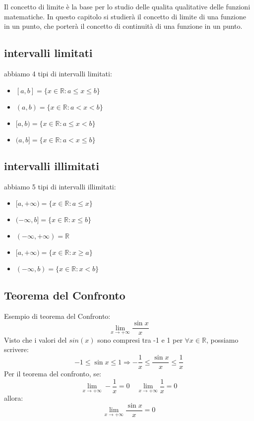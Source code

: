 Il concetto di limite è la base per lo studio delle qualita qualitative delle funzioni
matematiche. In questo capitolo si studierà il concetto di limite di una funzione in un
punto, che porterà il concetto di continuità di una funzione in un punto.
\subsection{intervalli limitati}
\label{subsec:intervalli_limitati}
abbiamo 4 tipi di intervalli limitati:
\begin{itemize}
    \item $[a,b] = \{x \in \mathbb{R} : a \leq x \leq b\}$
    \item $(a,b) = \{x \in \mathbb{R} : a < x < b\}$
    \item $[a,b) = \{x \in \mathbb{R} : a \leq x < b\}$
    \item $(a,b] = \{x \in \mathbb{R} : a < x \leq b\}$
\end{itemize}
\subsection{intervalli illimitati}
\label{subsec:intervalli_illimitati}
abbiamo 5 tipi di intervalli illimitati:
\begin{itemize}
    \item $[a,+\infty) = \{x \in \mathbb{R} : a \leq x\}$
    \item $(-\infty,b] = \{x \in \mathbb{R} : x \leq b\}$
    \item $(-\infty,+\infty) = \mathbb{R}$
    \item $[a,+\infty) = \{x \in \mathbb{R} : x \geq a\}$
    \item $(-\infty,b) = \{x \in \mathbb{R} : x < b\}$
    \end{itemize}

\subsection{Teorema del Confronto}
\label{subsec:teorema_del_confronto}

Esempio di teorema del Confronto:
\begin{equation}
    \lim_{x \to +\infty} \frac{\sin x}{x}    
    \end{equation}
    Visto che i valori del $sin(x)$ sono compresi tra -1 e 1 per $\forall x \in \mathbb{R}$, possiamo scrivere:
    \begin{equation}
        -1 \leq \sin x \leq 1 \Rightarrow -\frac{1}{x} \leq \frac{\sin x}{x} \leq \frac{1}{x}
        \end{equation}
        Per il teorema del confronto, se:
        \begin{equation}
            \lim_{x \to +\infty} -\frac{1}{x} = 0 \quad \lim_{x \to +\infty} \frac{1}{x} = 0
            \end{equation}
            allora:
            \begin{equation}
                \lim_{x \to +\infty} \frac{\sin x}{x} = 0
                \end{equation}
